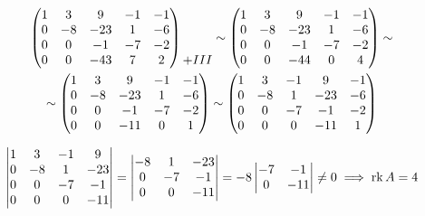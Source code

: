\begin{enumerate}
\begin{multline*}
\begin{pmatrix}
        	1 & 3 & 9 & -1 & -1 \\
            0 & -8 & -23 & 1 & -6 \\
            0 & 0 & -1 & -7 & -2 \\
            0 & 0 & -43 & 7 & 2
        \end{pmatrix}
        \begin{matrix}
        	\ \\
            \ \\
            \ \\
            + \rom3
        \end{matrix} \sim
        \begin{pmatrix}
        	1 & 3 & 9 & -1 & -1 \\
            0 & -8 & -23 & 1 & -6 \\
            0 & 0 & -1 & -7 & -2 \\
            0 & 0 & -44 & 0 & 4
        \end{pmatrix} \sim \\
        \sim
        \begin{pmatrix}
        	1 & 3 & 9 & -1 & -1 \\
            0 & -8 & -23 & 1 & -6 \\
            0 & 0 & -1 & -7 & -2 \\
            0 & 0 & -11 & 0 & 1
        \end{pmatrix} \sim
        \begin{pmatrix}
        	1 & 3 & -1 & 9 & -1 \\
            0 & -8 & 1 & -23 & -6 \\
            0 & 0 & -7 & -1 & -2 \\
            0 & 0 & 0 & -11 & 1
        \end{pmatrix}
    \end{multline*}
\end{enumerate}
$$
\begin{vmatrix}
	1 & 3 & -1 & 9 \\
    0 & -8 & 1 & -23 \\
    0 & 0 & -7 & -1 \\
    0 & 0 & 0 & -11
\end{vmatrix} =
\begin{vmatrix}
	-8 & 1 & -23 \\
    0 & -7 & -1 \\
    0 & 0 & -11
\end{vmatrix} = -8
\begin{vmatrix}
	-7 & -1 \\
    0 & -11
\end{vmatrix} \ne 0 \implies \operatorname{rk} A = 4 $$
